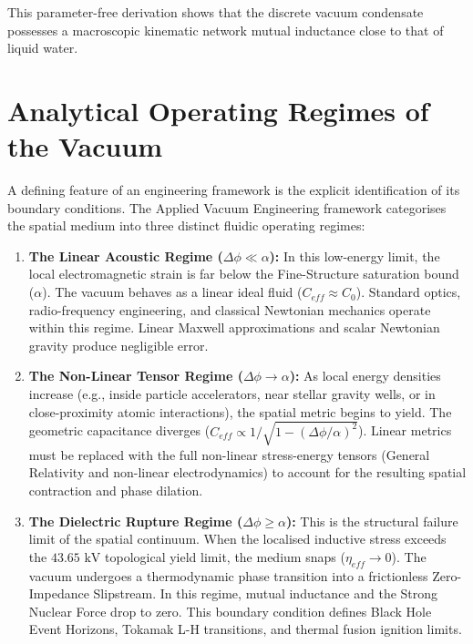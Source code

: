 This parameter-free derivation shows that the discrete vacuum condensate possesses
a macroscopic kinematic network mutual inductance close to that of liquid water.

\section{Analytical Operating Regimes of the Vacuum}

A defining feature of an engineering framework is the explicit identification of its boundary conditions. The Applied Vacuum Engineering framework categorises the spatial medium into three distinct fluidic operating regimes:

\begin{enumerate}
    \item \textbf{The Linear Acoustic Regime ($\Delta\phi \ll \alpha$):} In this low-energy limit, the local electromagnetic strain is far below the Fine-Structure saturation bound ($\alpha$). The vacuum behaves as a linear ideal fluid ($C_{eff} \approx C_0$). Standard optics, radio-frequency engineering, and classical Newtonian mechanics operate within this regime. Linear Maxwell approximations and scalar Newtonian gravity produce negligible error.
    
    \item \textbf{The Non-Linear Tensor Regime ($\Delta\phi \to \alpha$):} As local energy densities increase (e.g., inside particle accelerators, near stellar gravity wells, or in close-proximity atomic interactions), the spatial metric begins to yield. The geometric capacitance diverges ($C_{eff} \propto 1/\sqrt{1 - (\Delta\phi/\alpha)^2}$). Linear metrics must be replaced with the full non-linear stress-energy tensors (General Relativity and non-linear electrodynamics) to account for the resulting spatial contraction and phase dilation.

    \item \textbf{The Dielectric Rupture Regime ($\Delta\phi \ge \alpha$):} This is the structural failure limit of the spatial continuum. When the localised inductive stress exceeds the $43.65\text{ kV}$ topological yield limit, the medium snaps ($\eta_{eff} \to 0$). The vacuum undergoes a thermodynamic phase transition into a frictionless Zero-Impedance Slipstream. In this regime, mutual inductance and the Strong Nuclear Force drop to zero. This boundary condition defines Black Hole Event Horizons, Tokamak L-H transitions, and thermal fusion ignition limits.
\end{enumerate}

